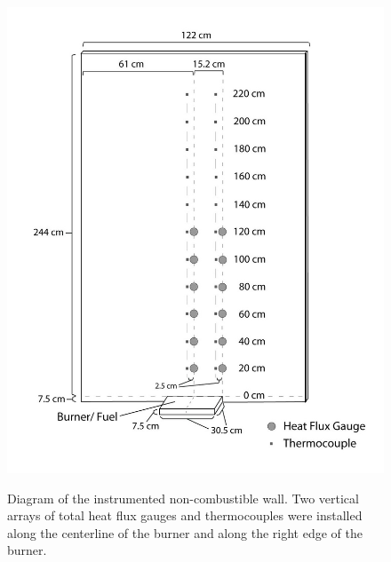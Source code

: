 \documentclass[twoside]{uocthesis}
\begin{document}
{{\begin{figure}
	\centering
	\includegraphics[width=\textwidth]{../Figures/Instrumented_NC_Wall}\\
	\caption[Diagram of the instrumented non-combustible wall]{Diagram of the instrumented non-combustible wall. Two vertical arrays of total heat flux gauges and thermocouples were installed along the centerline of the burner and along the right edge of the burner.}
	\label{Instrumented_NC_Wall}
\end{figure}

}}
\end{document}
